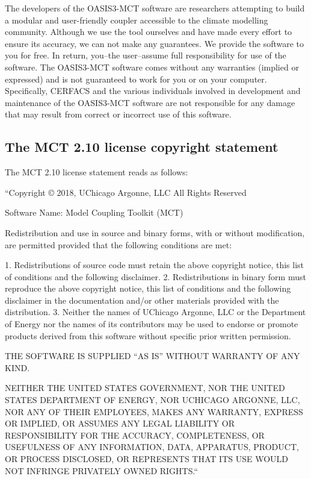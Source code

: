 The developers of the OASIS3-MCT software are researchers attempting to
build a modular and user-friendly coupler accessible to the climate
modelling community. Although we use the tool ourselves and have made
every effort to ensure its accuracy, we can not make any
guarantees. We provide the software to you for free. In return,
you--the user--assume full responsibility for use of the software. The
OASIS3-MCT software comes without any warranties (implied or expressed) and
is not guaranteed to work for you or on your computer. Specifically,
CERFACS and the various individuals involved in development and
maintenance of the OASIS3-MCT software are not responsible for any damage
that may result from correct or incorrect use of this software.

\subsection{The MCT 2.10 license copyright statement}
\label{sec_MCT}

The MCT 2.10 license statement reads as follows:

 ``Copyright © 2018, UChicago Argonne, LLC All Rights Reserved

Software Name: Model Coupling Toolkit (MCT)

Redistribution and use in source and binary forms, with or without
modification, are permitted provided that the following conditions are met:

1. Redistributions of source code must retain the above copyright notice, this 
list of conditions and the following disclaimer.
2. Redistributions in binary form must reproduce the above copyright notice, 
this list of conditions and the following disclaimer in the documentation
and/or other materials provided with the distribution.
3. Neither the names of UChicago Argonne, LLC or the Department of Energy nor 
the names of its contributors may be used to endorse or promote products
derived from this software without specific prior written permission.

THE SOFTWARE IS SUPPLIED ``AS IS'' WITHOUT WARRANTY OF ANY KIND.
 
NEITHER THE UNITED STATES GOVERNMENT, NOR THE UNITED STATES DEPARTMENT OF 
ENERGY, NOR UCHICAGO ARGONNE, LLC, NOR ANY OF THEIR EMPLOYEES, MAKES ANY 
WARRANTY, EXPRESS OR IMPLIED, OR ASSUMES ANY LEGAL LIABILITY OR RESPONSIBILITY 
FOR THE ACCURACY, COMPLETENESS, OR USEFULNESS OF ANY INFORMATION, DATA, 
APPARATUS, PRODUCT, OR PROCESS DISCLOSED, OR REPRESENTS THAT ITS USE WOULD 
NOT INFRINGE PRIVATELY OWNED RIGHTS.``


